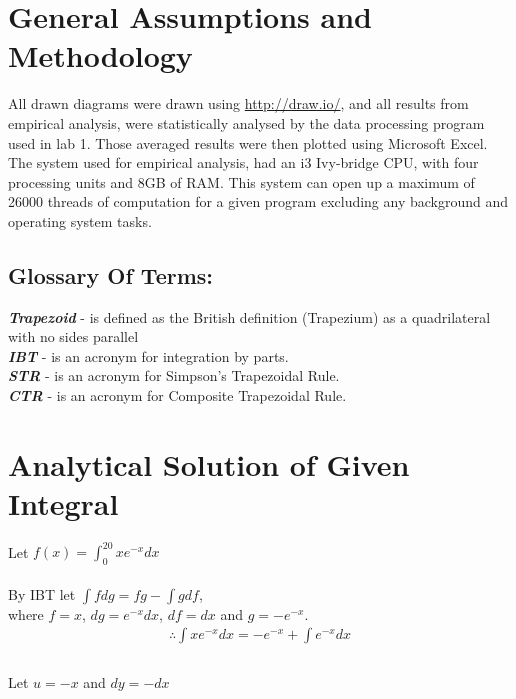 \documentclass[11pt]{article}
\begin{document}
\begin{page}
\clearpage
\setcounter{page}{1}

\section{General Assumptions and Methodology}
All drawn diagrams were drawn using \url{http://draw.io/}, and all results from empirical analysis, were statistically analysed by the data processing program used in lab 1. Those averaged results were then plotted using Microsoft Excel.\\

\noindent The system used for empirical analysis, had an i3 Ivy-bridge CPU, with four processing units and 8GB of RAM. This system can open up a maximum of 26000 threads of computation for a given program excluding any background and operating system tasks.\\

\subsection{Glossary Of Terms:}
\noindent \textbf{\textit{Trapezoid}} - is defined as the British definition (Trapezium) as a quadrilateral with no sides parallel \\
\noindent \textbf{\textit{IBT}} - is an acronym for integration by parts.\\
\noindent \textbf{\textit{STR}} - is an acronym for Simpson's Trapezoidal Rule.\\
\noindent \textbf{\textit{CTR}} - is an acronym for Composite Trapezoidal Rule.\\

\section{Analytical Solution of Given Integral}
\noindent Let $f(x) = \int_{0}^{20} xe^{-x} dx$\\
\\
\noindent By IBT let $\int fdg = fg - \int gdf$, \\
where $f = x$, $dg = e^{-x} dx$, $df = dx$ and $g = -e^{-x}$.\\

\begin{equation} 
\begin{aligned}
    \therefore{} \int xe^{-x} dx = -e^{-x} + \int e^{-x} dx\\ 
\end{aligned}
\end{equation}
\\
\noindent Let $u = -x$ and $dy = -dx$


\end{page}
\end{document}
